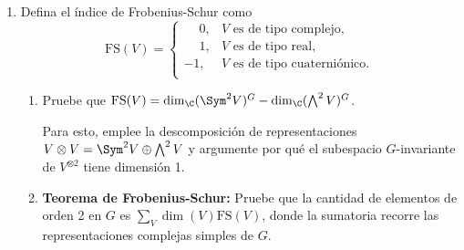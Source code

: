 \documentclass[11pt, reqno]{amsart}
\begin{document}
\begin{additional}
\begin{enumerate}
	\item Defina el índice de Frobenius-Schur como
		\[
			\mathrm{FS}(V) =
			\begin{cases}
				\phantom{-}0, & V\text{ es de tipo complejo,} \\
				\phantom{-}1, & V\text{ es de tipo real,} \\
				-1, & V\text{ es de tipo cuaterniónico.} \\
			\end{cases}
		\]
		\begin{enumerate}
			\item Pruebe que $\mathrm{FS}(V) = \dim_\C (\Sym^2V)^G - \dim_\C(\bigwedge^2 V)^G$.
				\begin{hint}
					Para esto, emplee la descomposición de representaciones $V \otimes V = \Sym^2V \oplus \bigwedge^2 V$
					y argumente por qué el subespacio $G$-invariante de $V^{\otimes 2}$ tiene dimensión 1.
				\end{hint}

			\item \textbf{Teorema de Frobenius-Schur:}
				Pruebe que la cantidad de elementos de orden 2 en $G$ es $\sum_V \dim(V)\mathrm{FS}(V)$, donde la sumatoria
				recorre las representaciones complejas simples de $G$.
		\end{enumerate}
\end{enumerate}


\printbibliography
\end{additional}
\end{document}
